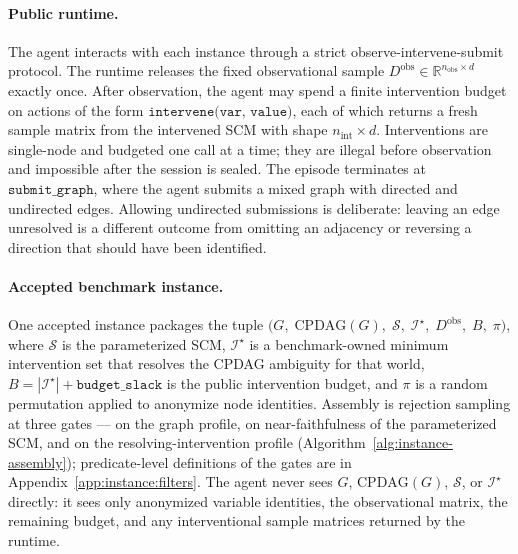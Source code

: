 

\paragraph{Public runtime.} The agent interacts with each instance through a strict observe-intervene-submit protocol. The runtime releases the fixed observational sample $D^{\mathrm{obs}} \in \mathbb{R}^{n_{\mathrm{obs}} \times d}$ exactly once. After observation, the agent may spend a finite intervention budget on actions of the form $\texttt{intervene(var, value)}$, each of which returns a fresh sample matrix from the intervened SCM with shape $n_{\mathrm{int}} \times d$. Interventions are single-node and budgeted one call at a time; they are illegal before observation and impossible after the session is sealed. The episode terminates at $\texttt{submit\_graph}$, where the agent submits a mixed graph with directed and undirected edges. Allowing undirected submissions is deliberate: leaving an edge unresolved is a different outcome from omitting an adjacency or reversing a direction that should have been identified.

\paragraph{Accepted benchmark instance.} One accepted instance packages the tuple $\bigl(G,\; \mathrm{CPDAG}(G),\; \mathcal{S},\; \mathcal{I}^\star,\; D^{\mathrm{obs}},\; B,\; \pi \bigr)$, where $\mathcal{S}$ is the parameterized SCM, $\mathcal{I}^\star$ is a benchmark-owned minimum intervention set that resolves the CPDAG ambiguity for that world, $B = |\mathcal{I}^\star| + \texttt{budget\_slack}$ is the public intervention budget, and $\pi$ is a random permutation applied to anonymize node identities. Assembly is rejection sampling at three gates --- on the graph profile, on near-faithfulness of the parameterized SCM, and on the resolving-intervention profile (Algorithm~\ref{alg:instance-assembly}); predicate-level definitions of the gates are in Appendix~\ref{app:instance:filters}. The agent never sees $G$, $\mathrm{CPDAG}(G)$, $\mathcal{S}$, or $\mathcal{I}^\star$ directly: it sees only anonymized variable identities, the observational matrix, the remaining budget, and any interventional sample matrices returned by the runtime.

